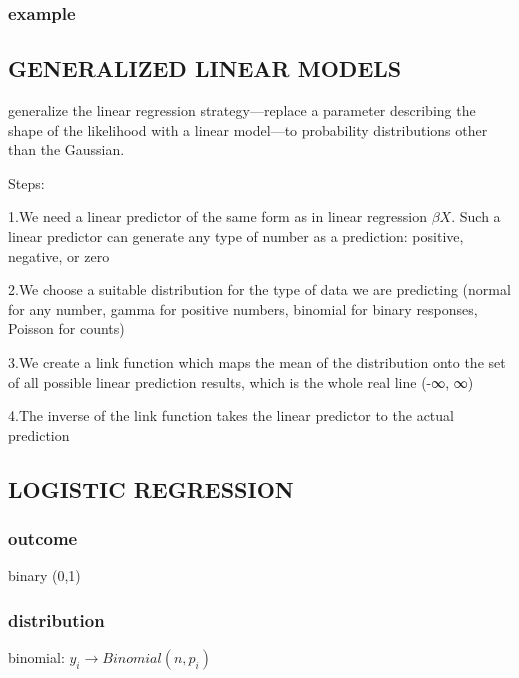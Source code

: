 \documentclass[
]{article}
\begin{document}
\hypertarget{example}{%
\subsubsection{example}\label{example}}

\hypertarget{generalized-linear-models}{%
\subsection{\texorpdfstring{\textbf{GENERALIZED LINEAR
MODELS}}{GENERALIZED LINEAR MODELS}}\label{generalized-linear-models}}

generalize the linear regression strategy---replace a parameter
describing the shape of the likelihood with a linear model---to
probability distributions other than the Gaussian.

Steps:

1.We need a linear predictor of the same form as in linear regression
\(\beta X\). Such a linear predictor can generate any type of number as
a prediction: positive, negative, or zero

2.We choose a suitable distribution for the type of data we are
predicting (normal for any number, gamma for positive numbers, binomial
for binary responses, Poisson for counts)

3.We create a link function which maps the mean of the distribution onto
the set of all possible linear prediction results, which is the whole
real line (-∞, ∞)

4.The inverse of the link function takes the linear predictor to the
actual prediction

\hypertarget{logistic-regression}{%
\subsection{LOGISTIC REGRESSION}\label{logistic-regression}}

\hypertarget{outcome-1}{%
\subsubsection{outcome}\label{outcome-1}}

binary (0,1)

\hypertarget{distribution-1}{%
\subsubsection{distribution}\label{distribution-1}}

binomial: \(y_i \to Binomial(n, p_i)\)
\end{document}
